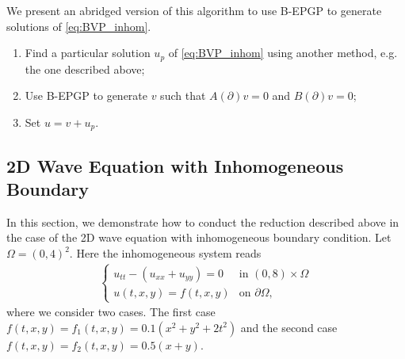 \documentclass{article} %
\theoremstyle{plain}
\theoremstyle{definition}
\theoremstyle{remark}
\newcommand{\p}{\partial}
\begin{document}
We  present an abridged version of this algorithm to use B-EPGP to generate solutions of \eqref{eq:BVP_inhom}. 
\begin{enumerate}
    \item Find a particular solution $u_p$ of \eqref{eq:BVP_inhom} using another method, e.g. the one described above;
    \item Use B-EPGP to generate $v$ such that $A(\partial)v=0$ and $B(\partial)v=0$;
    \item Set $u=v+u_p$.
\end{enumerate}
\subsection{2D Wave Equation with Inhomogeneous Boundary}\label{sec:2Dwave_inhom}
In this section, we demonstrate how to conduct the reduction described above in the case of the 2D wave equation with inhomogeneous boundary condition. Let $\Omega=(0,4)^2$. Here the inhomogeneous system reads
\begin{align}\label{eq:inhom_wave_3}
    \begin{cases}
        u_{tt}-(u_{xx}+u_{yy})=0&\text{in }(0,8)\times\Omega\\
        u(t,x,y)=f(t,x,y)&\text{on }\p\Omega,
    \end{cases}
\end{align}
where we consider two cases. The first case \(f(t,x,y)=f_1(t,x,y)=0.1(x^2+y^2+2t^2)\) and the second case \(f(t,x,y)=f_2(t,x,y)=0.5(x+y)\).
\end{document}
